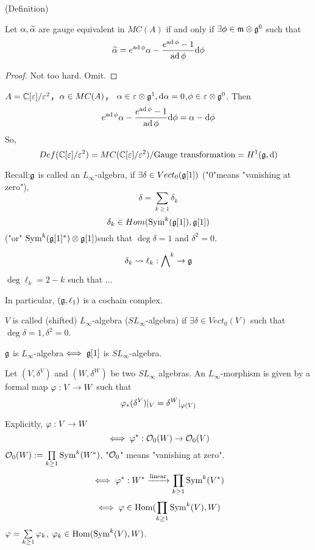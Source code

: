\begin{prop}(Definition)

Let $\alpha,\widetilde{\alpha}$ are gauge equivalent in $MC(A)$ if and only if
$\exists\phi\in\mathfrak{m}\otimes\mathfrak{g}^0$ such that
$$\widetilde{\alpha}=e^{\operatorname{ad}\phi}\alpha-\frac{e^{\operatorname{ad}\phi}-1}{\operatorname{ad}\phi}\mathrm{d}\phi$$
\end{prop}

\begin{proof}
Not too hard. Omit.
\end{proof}

\begin{example}$A=\mathbb{C}[\varepsilon]/\varepsilon^2$，$\alpha\in MC(A)$，
$\alpha\in\varepsilon\otimes \mathfrak{g}^1,\mathrm{d}\alpha=0$,$\phi\in\varepsilon\otimes\mathfrak{g}^0$. Then
$$e^{\operatorname{ad}\phi}\alpha-\frac{e^{\operatorname{ad}\phi}-1}{\operatorname{ad}\phi}\mathrm{d}\phi
=\alpha-\mathrm{d}\phi$$
So,
$$
  Def(\mathbb{C}[\varepsilon]/\varepsilon^2)
=MC(\mathbb{C}[\varepsilon]/\varepsilon^2)/\text{Gauge transformation}
=H^1(\mathfrak{g},\mathrm{d})
$$
\end{example}

Recall:$\mathfrak{g}$ is called an $L_\infty$-algebra, 
if $\exists\delta\in Vect_0(\mathfrak{g}[1])$
("$0$"means "vanishing at zero"),
$$\delta=\sum_{k\geq 1}\delta_k$$
$$\delta_k\in Hom(\operatorname{Sym}^k(\mathfrak{g}[1]),\mathfrak{g}[1])$$
("or" $\operatorname{Sym}^k(\mathfrak{g}[1]^*)\otimes\mathfrak{g}[1]$)such that 
$\deg\delta=1$ and $\delta^2=0$.

$$\delta_k\rightsquigarrow
\ell_k:\bigwedge\nolimits^{k}\to\mathfrak{g}$$
$\deg\ell_k=2-k$ such that ...

In particular, $(\mathfrak{g},\ell_1)$ is a cochain complex.

\begin{definition}
$V$ is called (shifted) $L_\infty$-algebra
($SL_\infty$-algebra) if $\exists \delta\in Vect_0(V)$
such that $\deg\delta=1,\delta^2=0$.

$\mathfrak{g}$ is $L_\infty$-algebra$\iff\mathfrak{g}[1]$ is $SL_{\infty}$-algebra.
\end{definition}

\begin{definition}
Let $(V,\delta^V)$ and $(W,\delta^W)$ be two $SL_\infty$ algebras.
An $L_\infty$-morphism is given by a formal map
$\varphi: V\to W$ such that
$$\varphi_*(\delta^V)|_V=\delta^W|_{\varphi(V)}$$
\end{definition}

Explicitly, $\varphi:V\to W$
$$\iff \varphi^*:\mathcal{O}_0(W)\to\mathcal{O}_0(V)$$
$\mathcal{O}_0(W):=\prod\limits_{k\geq 1}\operatorname{Sym}^k(W^*)$,
"$\mathcal{O}_0$" means "vanishing at zero".
$$\iff\varphi^*: W^*\xrightarrow{\text{linear}}\prod_{k\geq 1}\operatorname{Sym}^k(V^*)$$
$$\iff\varphi\in \operatorname{Hom}(\prod_{k\geq 1}\operatorname{Sym}^k(V),W)$$
$\varphi=\sum\limits_{k\geq 1}\varphi_k$, 
$\varphi_k\in\operatorname{Hom}(\operatorname{Sym}^k(V),W)$.


